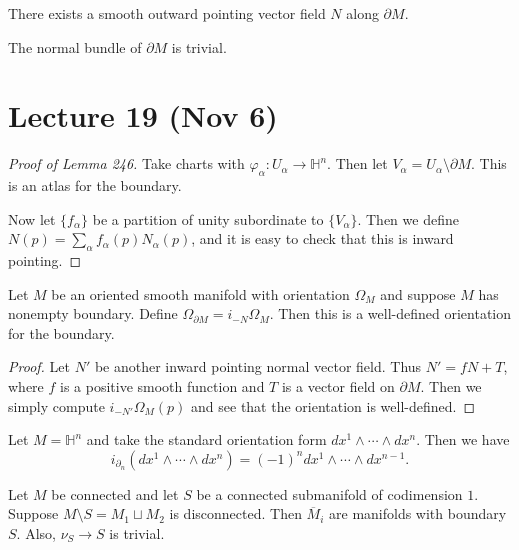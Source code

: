 \documentclass[twoside, 10pt]{article}
\renewcommand{\H}{\mathbb{H}}
\begin{document}
    \begin{lem}
        There exists a smooth outward pointing vector field $N$ along $\partial M$.
    \end{lem}

    \begin{cor}
        The normal bundle of $\partial M$ is trivial.
    \end{cor}

    \section{Lecture 19 (Nov 6)}%
    \label{sec:lecture_19_nov_6_}
    
    \begin{proof}[Proof of Lemma 246]
        Take charts with $\varphi_{\alpha}: U_{\alpha} \to \H^n$. Then let $V_{\alpha} = U_{\alpha} \setminus \partial M$. This is an atlas for the boundary.

        Now let $\{f_{\alpha} \} $ be a partition of unity subordinate to $\{V_{\alpha}\}$. Then we define $N(p) = \sum_{\alpha} f_{\alpha}(p) N_{\alpha}(p)$, and it is easy to check that this is inward pointing.
    \end{proof}

    \begin{prop}
        Let $M$ be an oriented smooth manifold with orientation $\Omega_M$ and suppose $M$ has nonempty boundary. Define $\Omega_{\partial M} = i_{-N}\Omega_M$. Then this is a well-defined orientation for the boundary.
    \end{prop}

    \begin{proof}
        Let $N'$ be another inward pointing normal vector field. Thus $N' = fN + T$, where $f$ is a positive smooth function and $T$ is a vector field on $\partial M$. Then we simply compute $i_{-N'}\Omega_M(p)$ and see that the orientation is well-defined.
    \end{proof}

    \begin{exm}
        Let $M = \H^n$ and take the standard orientation form $dx^1 \wedge \cdots \wedge dx^n$. Then we have
        \[ i_{\partial_n}(dx^1 \wedge \cdots \wedge dx^n) = (-1)^n dx^1 \wedge \cdots \wedge dx^{n-1}.\]
    \end{exm}

    \begin{lem}
        Let $M$ be connected and let $S$ be a connected submanifold of codimension $1$. Suppose $M \setminus S = M_1 \sqcup M_2$ is disconnected. Then $\overline{M}_i$ are manifolds with boundary $S$. Also, $\nu_S \to S$ is trivial.
    \end{lem}
\end{document}
